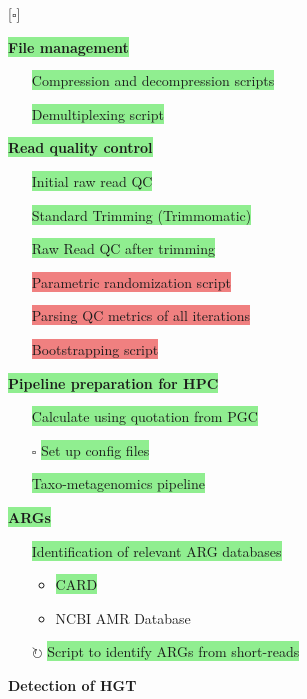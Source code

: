 \documentclass[11pt]{article}
\newcommand{\done}{\checkmark}  %
\newcommand{\pending}{$\square$}  %
\newcommand{\refine}{$\circlearrowright$}  %
\newcommand{\highlightessential}[1]{\colorbox{lightgreen}{#1}}  %
\newcommand{\highlightoptional}[1]{\colorbox{lightorange}{#1}}  %
\newcommand{\highlightrobust}[1]{\colorbox{lightcoral}{#1}}  %
\begin{document}
[\pending] \par\noindent\highlightessential{\textbf{\large File management}}
\begin{itemize}
	\item [\done] \highlightessential{Compression and decompression scripts}
	\item [\done] \highlightessential{Demultiplexing script}

\end{itemize}
\par\noindent\highlightessential{\textbf{\large Read quality control}}
	\begin{itemize}
		\item [\done] \highlightessential{Initial raw read QC}
		\item [\done] \highlightessential{Standard Trimming (Trimmomatic)}
		\item [\done] \highlightessential{Raw Read QC after trimming}
		\item [\done] \highlightrobust{Parametric randomization script}
		\item [\done] \highlightrobust{Parsing QC metrics of all iterations}
		\item [\done] \highlightrobust{Bootstrapping script}

	\end{itemize}
\par\noindent\highlightessential{\textbf{\large Pipeline preparation for HPC}}
\begin{itemize}
	\item [\done] \highlightessential{Calculate using quotation from PGC}
	\item [\pending] \highlightessential{Set up config files}  %
	\item [\done] \highlightessential{Taxo-metagenomics pipeline}	
\end{itemize}

\par\noindent\highlightessential{\textbf{\large ARGs}}  %
\begin{itemize}
	\item [\done] \highlightessential{Identification of relevant ARG databases}
	\begin{itemize}
		\item \highlightessential{CARD}
		\item \highlightoptional{NCBI AMR Database}
	\end{itemize}
	\item [\refine]\highlightessential{Script to identify ARGs from short-reads}
\end{itemize}
\par\noindent\highlightoptional{{\textbf{\large Detection of HGT}}}	
\end{document}
